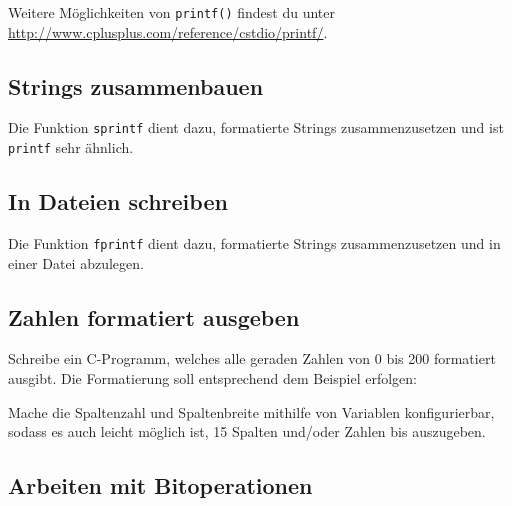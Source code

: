 

Weitere Möglichkeiten von \lstinline{printf()} findest du unter \url{http://www.cplusplus.com/reference/cstdio/printf/}.


\subsection{Strings zusammenbauen}

Die Funktion \lstinline{sprintf} dient dazu, formatierte Strings zusammenzusetzen und ist \lstinline{printf} sehr ähnlich.


\subsection{In Dateien schreiben}

Die Funktion \lstinline{fprintf} dient dazu, formatierte Strings zusammenzusetzen und in einer Datei abzulegen.


\subsection{Zahlen formatiert ausgeben}
\label{sec:CFormatNumbers}
Schreibe ein C-Programm, welches alle geraden Zahlen von 0 bis 200 formatiert ausgibt.
Die Formatierung soll entsprechend dem Beispiel erfolgen:
%

%
Mache die Spaltenzahl und Spaltenbreite mithilfe von Variablen konfigurierbar, sodass es auch leicht möglich ist, 15 Spalten und/oder Zahlen bis  auszugeben.

\subsection{Arbeiten mit Bitoperationen}


